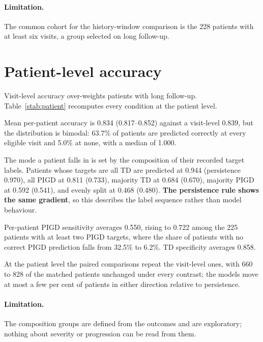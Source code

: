 \paragraph{Limitation.} The common cohort for the history-window comparison is the
228 patients with at least six visits, a group selected on long follow-up.

\section{Patient-level accuracy}
\label{sup:patient}

Visit-level accuracy over-weights patients with long follow-up.
Table~\ref{stab:patient} recomputes every condition at the patient level.

Mean per-patient accuracy is 0.834 (0.817--0.852) against a visit-level 0.839,
but the distribution is bimodal: 63.7\% of patients are predicted correctly at
every eligible visit and 5.0\% at none, with a median of 1.000.

The mode a patient falls in is set by the composition of their recorded target
labels. Patients whose targets are all TD are predicted at 0.944 (persistence
0.970), all PIGD at 0.811 (0.733), majority TD at 0.684 (0.670), majority PIGD at
0.592 (0.541), and evenly split at 0.468 (0.480). \textbf{The persistence rule
shows the same gradient}, so this describes the label sequence rather than model
behaviour.

Per-patient PIGD sensitivity averages 0.550, rising to 0.722 among the 225
patients with at least two PIGD targets, where the share of patients with no
correct PIGD prediction falls from 32.5\% to 6.2\%. TD specificity averages 0.858.

At the patient level the paired comparisons repeat the visit-level ones, with 660
to 828 of the matched patients unchanged under every contrast; the models move at
most a few per cent of patients in either direction relative to persistence.

\begin{table}[htbp]
\centering
\caption{Patient-level accuracy: distribution, composition groups, class-specific
rates and paired comparisons.}
\label{stab:patient}
\small

\end{table}

\paragraph{Limitation.} The composition groups are defined from the outcomes and
are exploratory; nothing about severity or progression can be read from them.


